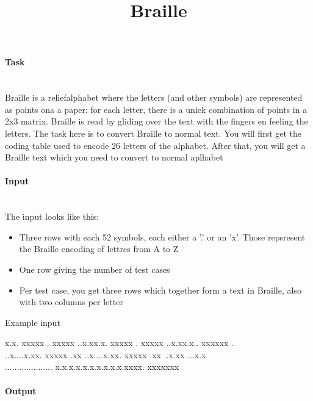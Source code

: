 \documentclass[10pt,a4paper]{article}
\begin{document}
\title{Braille}
\maketitle

\paragraph{Task\\ \\}


Braille is a reliefalphabet where the letters (and other symbols) are represented as points ona a paper: for each letter, there is a uniek combination of points in a 2x3 matrix. Braille is read by gliding over the text with the fingers en feeling the letters. The task here is to convert Braille to normal text. You will first get the coding table used to encode 26 letters of the alphabet. After that, you will get a Braille text which you need to convert to normal aplhabet

\paragraph{Input\\ \\}

The input looks like this: \\
\begin{itemize}
	\item Three rows with each 52 symbols, each either a '.' or an 'x'. Those repsresent the Braille encoding of lettres from A to Z
	\item One row giving the number of test cases
	\item Per test case, you get three rows which together form a text in Braille, also with two columns per letter
\end{itemize}

\begin{center}
Example input
\end{center}
\mbox{}

x.x. xxxxx . xxxxx ..x.xx.x. xxxxx . xxxxx ..x.xx.x.. xxxxxx .\\
..x....x.xx. xxxxx .xx ..x....x.xx. xxxxx .xx ..x.xx ...x.x\\
.................... x.x.x.x.x.x.x.x.x.x.xxxx. xxxxxxx
	
\paragraph{Output\\ \\}
\end{document}
